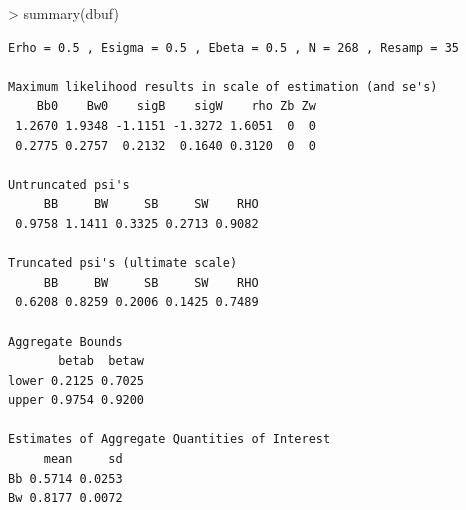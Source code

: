\documentclass[11pt,oneside,letterpaper,titlepage]{article}
\begin{document}
\begin{Schunk}
\begin{Sinput}
> summary(dbuf)
\end{Sinput}
\end{Schunk}

\begin{verbatim}
Erho = 0.5 , Esigma = 0.5 , Ebeta = 0.5 , N = 268 , Resamp = 35

Maximum likelihood results in scale of estimation (and se's)
    Bb0    Bw0    sigB    sigW    rho Zb Zw
 1.2670 1.9348 -1.1151 -1.3272 1.6051  0  0
 0.2775 0.2757  0.2132  0.1640 0.3120  0  0

Untruncated psi's
     BB     BW     SB     SW    RHO
 0.9758 1.1411 0.3325 0.2713 0.9082

Truncated psi's (ultimate scale)
     BB     BW     SB     SW    RHO
 0.6208 0.8259 0.2006 0.1425 0.7489

Aggregate Bounds
       betab  betaw
lower 0.2125 0.7025
upper 0.9754 0.9200

Estimates of Aggregate Quantities of Interest
     mean     sd
Bb 0.5714 0.0253
Bw 0.8177 0.0072

\end{verbatim}
\end{document}
